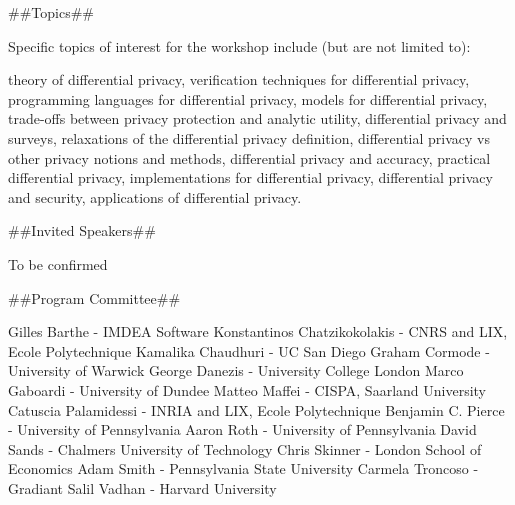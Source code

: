 ##Topics##

Specific topics of interest for the workshop include (but are not limited to):

theory of differential privacy,
verification techniques for differential privacy,
programming languages for differential privacy,
models for differential privacy,
trade-offs between privacy protection and analytic utility,
differential privacy and surveys,
relaxations of the differential privacy definition,
differential privacy vs other privacy notions and methods,
differential privacy and accuracy,
practical differential privacy,
implementations for differential privacy,
differential privacy and security,
applications of differential privacy.

##Invited Speakers##

To be confirmed

##Program Committee##

Gilles Barthe - IMDEA Software
Konstantinos Chatzikokolakis - CNRS and LIX, Ecole Polytechnique
Kamalika Chaudhuri - UC San Diego
Graham Cormode - University of Warwick
George Danezis - University College London
Marco Gaboardi - University of Dundee
Matteo Maffei - CISPA, Saarland University
Catuscia Palamidessi - INRIA and LIX, Ecole Polytechnique
Benjamin C. Pierce - University of Pennsylvania
Aaron Roth - University of Pennsylvania
David Sands - Chalmers University of Technology
Chris Skinner - London School of Economics
Adam Smith - Pennsylvania State University
Carmela Troncoso - Gradiant
Salil Vadhan - Harvard University
